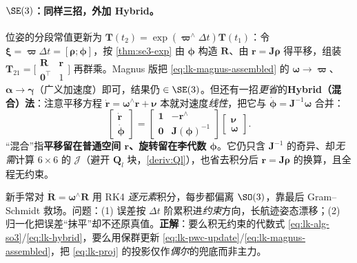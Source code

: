 \paragraph{$\SE(3)$：同样三招，外加 Hybrid。}位姿的分段常值更新为 $\mathbf{T}(t_2)=\exp(\boldsymbol{\varpi}^\wedge\Delta t)\mathbf{T}(t_1)$：令 $\boldsymbol{\xi}=\boldsymbol{\varpi}\Delta t=[\boldsymbol{\rho};\boldsymbol{\phi}]$，按 \cref{thm:se3-exp} 由 $\boldsymbol{\phi}$ 构造 $\mathbf{R}$、由 $\mathbf{r}=\mathbf{J}\boldsymbol{\rho}$ 得平移，组装 $\mathbf{T}_{21}=\big[\begin{smallmatrix}\mathbf{R}&\mathbf{r}\\\mathbf{0}^\top&1\end{smallmatrix}\big]$ 再群乘。Magnus 版把 \cref{eq:lk-magnus-assembled} 的 $\boldsymbol{\omega}\to\boldsymbol{\varpi}$、$\boldsymbol{\alpha}\to\boldsymbol{\gamma}$（广义加速度）即可，结果仍 $\in\SE(3)$。但还有一招\emph{更省}的\textbf{Hybrid（混合）法}：注意平移方程 $\dot{\mathbf{r}}=\boldsymbol{\omega}^\wedge\mathbf{r}+\boldsymbol{\nu}$ 本就对速度\emph{线性}，把它与 $\dot{\boldsymbol{\phi}}=\mathbf{J}^{-1}\boldsymbol{\omega}$ 合并：
\begin{equation}
  \begin{bmatrix}\dot{\mathbf{r}}\\\dot{\boldsymbol{\phi}}\end{bmatrix}
  =\begin{bmatrix}\mathbf{1}&-\mathbf{r}^\wedge\\\mathbf{0}&\mathbf{J}(\boldsymbol{\phi})^{-1}\end{bmatrix}
  \begin{bmatrix}\boldsymbol{\nu}\\\boldsymbol{\omega}\end{bmatrix}.
  \label{eq:lk-hybrid}
\end{equation}
“混合”指\textbf{平移留在普通空间 $\mathbf{r}$、旋转留在李代数 $\boldsymbol{\phi}$}。它仍只含 $\mathbf{J}^{-1}$ 的奇异、却\emph{无需}计算 $6\times6$ 的 $\boldsymbol{\mathcal{J}}$（避开 $\mathbf{Q}_l$ 块，\cref{deriv:Ql}），也省去积分后 $\mathbf{r}=\mathbf{J}\boldsymbol{\rho}$ 的换算，且全程无约束\cite{barfoot2024state}。

\begin{pitfall}
新手常对 $\dot{\mathbf{R}}=\boldsymbol{\omega}^\wedge\mathbf{R}$ 用 RK4 \emph{逐元素}积分，每步都偏离 $\SO(3)$，靠最后 Gram--Schmidt 救场。问题：(1) 误差按 $\Delta t$ 阶累积进\emph{约束}方向，长航迹姿态漂移；(2) 归一化把误差“抹平”却不还原真值。\textbf{正解}：要么积无约束的代数式 \cref{eq:lk-alg-so3}/\cref{eq:lk-hybrid}，要么用保群更新 \cref{eq:lk-pwc-update}/\cref{eq:lk-magnus-assembled}，把 \cref{eq:lk-proj} 的投影仅作\emph{偶尔}的兜底而非主力。
\end{pitfall}

